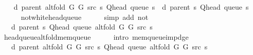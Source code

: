 \begin{isabellebody}
\isanewline
\ \ \isamarkupfalse%
\ {\isachardoublequoteopen}d\ {\isacharparenleft}{\kern0pt}parent\ {\isacharparenleft}{\kern0pt}alt{\isacharunderscore}{\kern0pt}fold\ G{}\ G{}\ src\ s{\isacharparenright}{\kern0pt}{\isacharparenright}{\kern0pt}\ {\isacharparenleft}{\kern0pt}Q{\isacharunderscore}{\kern0pt}head\ {\isacharparenleft}{\kern0pt}queue\ s{\isacharparenright}{\kern0pt}{\isacharparenright}{\kern0pt}\ {\isacharequal}{\kern0pt}\ d\ {\isacharparenleft}{\kern0pt}parent\ s{\isacharparenright}{\kern0pt}\ {\isacharparenleft}{\kern0pt}Q{\isacharunderscore}{\kern0pt}head\ {\isacharparenleft}{\kern0pt}queue\ s{\isacharparenright}{\kern0pt}{\isacharparenright}{\kern0pt}{\isachardoublequoteclose}\isanewline
\ \ \ \ \isamarkupfalse%
\ not{\isacharunderscore}{\kern0pt}white{\isacharunderscore}{\kern0pt}head{\isacharunderscore}{\kern0pt}queue\isanewline
\ \ \ \ \isamarkupfalse%
\ {\isacharparenleft}{\kern0pt}simp\ add{\isacharcolon}{\kern0pt}\ not{\isacharunderscore}{\kern0pt}{\isacharparenleft}{\kern0pt}{}{\isacharparenright}{\kern0pt}{\isacharparenright}{\kern0pt}\isanewline
\ \ \isamarkupfalse%
\ \isamarkupfalse%
\ {\isachardoublequoteopen}{\isachardot}{\kern0pt}{\isachardot}{\kern0pt}{\isachardot}{\kern0pt}\ {\isasymle}\ d\ {\isacharparenleft}{\kern0pt}parent\ s{\isacharparenright}{\kern0pt}\ {\isacharparenleft}{\kern0pt}Q{\isacharunderscore}{\kern0pt}head\ {\isacharparenleft}{\kern0pt}queue\ {\isacharparenleft}{\kern0pt}alt{\isacharunderscore}{\kern0pt}fold\ G{}\ G{}\ src\ s{\isacharparenright}{\kern0pt}{\isacharparenright}{\kern0pt}{\isacharparenright}{\kern0pt}{\isachardoublequoteclose}\isanewline
\ \ \ \ \isamarkupfalse%
\ head{\isacharunderscore}{\kern0pt}queue{\isacharunderscore}{\kern0pt}alt{\isacharunderscore}{\kern0pt}fold{\isacharunderscore}{\kern0pt}mem{\isacharunderscore}{\kern0pt}queue\isanewline
\ \ \ \ \isamarkupfalse%
\ {\isacharparenleft}{\kern0pt}intro\ mem{\isacharunderscore}{\kern0pt}queue{\isacharunderscore}{\kern0pt}imp{\isacharunderscore}{\kern0pt}d{\isacharunderscore}{\kern0pt}ge{\isacharparenright}{\kern0pt}\isanewline
\ \ \isamarkupfalse%
\ \isamarkupfalse%
\ {\isachardoublequoteopen}{\isachardot}{\kern0pt}{\isachardot}{\kern0pt}{\isachardot}{\kern0pt}\ {\isacharequal}{\kern0pt}\ d\ {\isacharparenleft}{\kern0pt}parent\ {\isacharparenleft}{\kern0pt}alt{\isacharunderscore}{\kern0pt}fold\ G{}\ G{}\ src\ s{\isacharparenright}{\kern0pt}{\isacharparenright}{\kern0pt}\ {\isacharparenleft}{\kern0pt}Q{\isacharunderscore}{\kern0pt}head\ {\isacharparenleft}{\kern0pt}queue\ {\isacharparenleft}{\kern0pt}alt{\isacharunderscore}{\kern0pt}fold\ G{}\ G{}\ src\ s{\isacharparenright}{\kern0pt}{\isacharparenright}{\kern0pt}{\isacharparenright}{\kern0pt}{\isachardoublequoteclose}\isanewline

\end{isabellebody}
